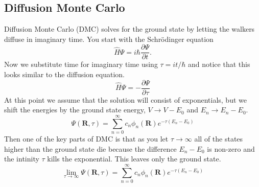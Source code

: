 \subsection{Diffusion Monte Carlo}
Diffusion Monte Carlo (DMC) solves for the ground state by letting the walkers diffuse in imaginary time. You start with the Schr\"odinger equation
\begin{equation}
   \hat{H}\Psi = i\hbar\frac{\partial\Psi}{\partial t}.
\end{equation}
Now we substitute time for imaginary time using $\tau=it/\hbar$ and notice that this looks similar to the diffusion equation.
\begin{equation}
   \hat{H}\Psi = -\frac{\partial\Psi}{\partial\tau}
\end{equation}
At this point we assume that the solution will consist of exponentials, but we shift the energies by the ground state energy, $V\rightarrow V - E_0$ and $E_n \rightarrow E_n-E_0$.
\begin{equation}
   \Psi(\mathbf{R},\tau) = \sum\limits_{n=0}^\infty c_n\phi_n(\mathbf{R})e^{-\tau(E_n-E_0)}
\end{equation}
Then one of the key parts of DMC is that as you let $\tau\rightarrow\infty$ all of the states higher than the ground state die because the difference $E_n-E_0$ is non-zero and the intinity $\tau$ kills the exponential. This leaves only the ground state.
\begin{equation}
   \lim\limits_{\tau\rightarrow\infty}\Psi(\mathbf{R},\tau) = \sum\limits_{n=0}^\infty c_n\phi_n(\mathbf{R})e^{-\tau(E_n-E_0)}
\end{equation}

